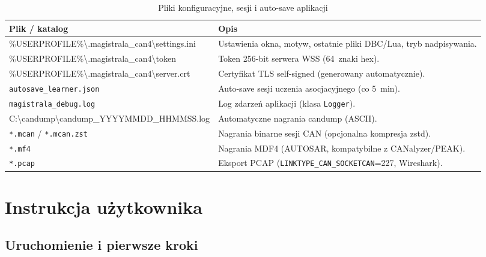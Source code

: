 \documentclass[12pt, a4paper]{article}
\begin{document}
\begin{table}[H]
\caption{Pliki konfiguracyjne, sesji i auto-save aplikacji}
\label{tab:configfiles}
\centering
\small
\begin{tabular}{p{7.0cm}p{7.5cm}}
\toprule
\textbf{Plik / katalog} & \textbf{Opis} \\
\midrule
{\footnotesize\ttfamily \%USERPROFILE\%\textbackslash{}\linebreak[4].magistrala\_can4\textbackslash{}\linebreak[4]settings.ini} &
  Ustawienia okna, motyw, ostatnie pliki DBC/Lua, tryb nadpisywania. \\[4pt]
{\footnotesize\ttfamily \%USERPROFILE\%\textbackslash{}\linebreak[4].magistrala\_can4\textbackslash{}token} &
  Token 256-bit serwera WSS (64~znaki hex). \\[4pt]
{\footnotesize\ttfamily \%USERPROFILE\%\textbackslash{}\linebreak[4].magistrala\_can4\textbackslash{}server.crt} &
  Certyfikat TLS self-signed (generowany automatycznie). \\[4pt]
\texttt{autosave\_learner.json} &
  Auto-save sesji uczenia asocjacyjnego (co 5~min). \\[4pt]
\texttt{magistrala\_debug.log} &
  Log zdarzeń aplikacji (klasa \texttt{Logger}). \\[4pt]
{\footnotesize\ttfamily C:\textbackslash{}candump\textbackslash{}candump\_YYYYMMDD\_HHMMSS.log} &
  Automatyczne nagrania candump (ASCII). \\[4pt]
\texttt{*.mcan} / \texttt{*.mcan.zst} &
  Nagrania binarne sesji CAN (opcjonalna kompresja zstd). \\[4pt]
\texttt{*.mf4} &
  Nagrania MDF4 (AUTOSAR, kompatybilne z CANalyzer/PEAK). \\[4pt]
\texttt{*.pcap} &
  Eksport PCAP (\texttt{LINKTYPE\_CAN\_SOCKETCAN}=227, Wireshark). \\
\bottomrule
\end{tabular}
\end{table}

\section{Instrukcja użytkownika}

\subsection{Uruchomienie i pierwsze kroki}
\end{document}
